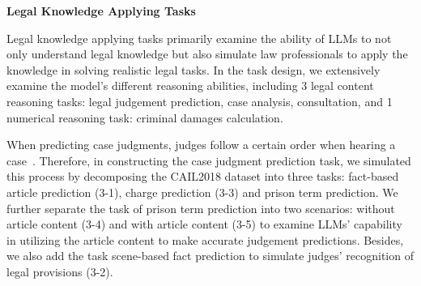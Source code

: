 \textbf{Legal Knowledge Applying Tasks}

Legal knowledge applying tasks primarily examine the ability of LLMs to not only understand legal knowledge but also simulate law professionals to apply the knowledge in solving realistic legal tasks. In the task design, we extensively examine the model's different reasoning abilities, including 3 legal content reasoning tasks: legal judgement prediction, case analysis, consultation, and 1 numerical reasoning task: criminal damages calculation. 

When predicting case judgments, judges follow a certain order when hearing a case~\cite{zhong2018legal,huang2021dependency}. Therefore, in constructing the case judgment prediction task, we simulated this process by decomposing the CAIL2018 dataset into three tasks: fact-based article prediction (3-1), charge prediction (3-3) and prison term prediction. We further separate the task of prison term prediction into two scenarios: without article content (3-4) and with article content (3-5) to examine LLMs' capability in utilizing the article content to make accurate judgement predictions. Besides, we also add the task scene-based fact prediction  to simulate judges’
recognition of legal provisions (3-2).


